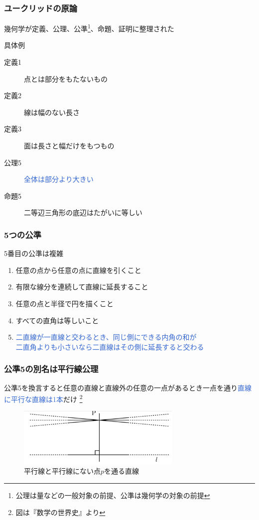 \documentclass[unicode, 14pt, aspectratio=169]{beamer}
\newcommand\blfootnote[1]{%
  \begingroup
  \renewcommand\thefootnote{}\footnote{#1}%
  \addtocounter{footnote}{-1}%
  \endgroup
}
\begin{document}
\begin{frame}
  \frametitle{ユークリッドの原論}
  {\large 幾何学が定義、公理、公準\footnote{公理は量などの一般対象の前提、公準は幾何学の対象の前提}、命題、証明に整理された}
  \par
  \vspace{16pt}
  具体例
  \begin{description}
  \item[定義1] 点とは部分をもたないもの
  \item[定義2] 線は幅のない長さ
  \item[定義3] 面は長さと幅だけをもつもの
  \item[公理5] \textcolor{highlight}{全体は部分より大きい}
  \item[命題5] 二等辺三角形の底辺はたがいに等しい
  \end{description}
  
\end{frame}
\begin{frame}
  \frametitle{5つの公準}
  {\large 5番目の公準は複雑}
  \par
  \vspace{16pt}  
  \begin{enumerate}
  \item 任意の点から任意の点に直線を引くこと
  \item 有限な線分を連続して直線に延長すること
  \item 任意の点と半径で円を描くこと
  \item すべての直角は等しいこと
  \item \textcolor{highlight}{二直線が一直線と交わるとき、同じ側にできる内角の和が\\二直角よりも小さいなら二直線はその側に延長すると交わる}
  \end{enumerate}
\end{frame}
\begin{frame}[t]
  \frametitle{公準5の別名は平行線公理}
  {\large 公準5を換言すると任意の直線と直線外の任意の一点があるとき一点を通り\textcolor{highlight}{直線に平行な直線は1本}だけ}
  \blfootnote{図は『数学の世界史』\supercite{suugaku-no-sekaishi}より}
  \begin{figure}
    \includegraphics[width=0.7\textwidth]{images/axiom5.png}
    \caption{平行線と平行線にない点$p$を通る直線}
  \end{figure}
\end{frame}
\end{document}
